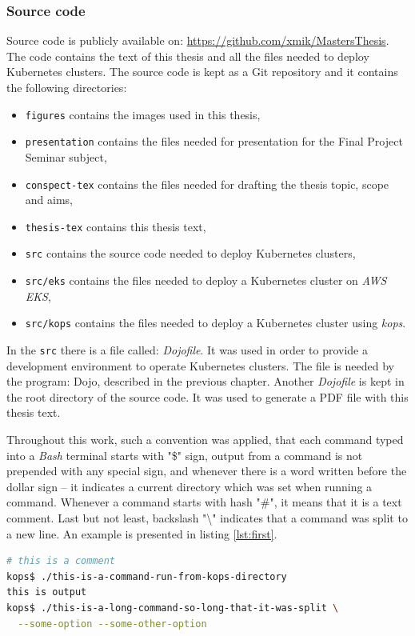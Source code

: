 \subsubsection{Source code}
\label{5-sc}
Source code is publicly available on: \url{https://github.com/xmik/MastersThesis}. The code contains the text of this thesis and all the files needed to deploy Kubernetes clusters. The source code is kept as a Git repository and it contains the following directories:
\begin{itemize}
\item \verb|figures| contains the images used in this thesis,
\item \verb|presentation| contains the files needed for presentation for the Final Project Seminar subject,
\item \verb|conspect-tex| contains the files needed for drafting the thesis topic, scope and aims,
\item \verb|thesis-tex| contains this thesis text,
\item \verb|src| contains the source code needed to deploy Kubernetes clusters,
\item \verb|src/eks| contains the files needed to deploy a Kubernetes cluster on \textit{AWS EKS},
\item \verb|src/kops| contains the files needed to deploy a Kubernetes cluster using \textit{kops}.
\end{itemize}

In the \verb|src| there is a file called: \textit{Dojofile}. It was used in order to provide a development environment to operate Kubernetes clusters. The file is needed by the program: Dojo, described in the previous chapter. Another \textit{Dojofile} is kept in the root directory of the source code. It was used to generate a PDF file with this thesis text.

Throughout this work, such a convention was applied, that each command typed into a \textit{Bash} terminal starts with "\$" sign, output from a command is not prepended with any special sign, and whenever there is a word written before the dollar sign -- it indicates a current directory which was set when running a command. Whenever a command starts with hash "\#", it means that it is a text comment. Last but not least, backslash "\textbackslash" indicates that a command was split to a new line. An example is presented in listing \ref{lst:first}.
\begin{lstlisting}[basicstyle=\scriptsize,label=lst:first,caption={An example code listing explaining the format},captionpos=b,language=Bash ]
# this is a comment
kops$ ./this-is-a-command-run-from-kops-directory
this is output
kops$ ./this-is-a-long-command-so-long-that-it-was-split \
  --some-option --some-other-option
\end{lstlisting}

